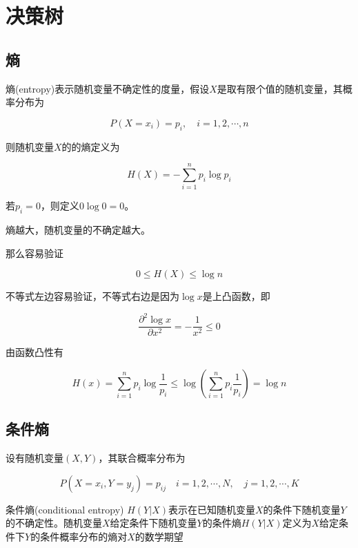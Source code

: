 \section{决策树}
\subsection{熵}

熵(entropy)表示随机变量不确定性的度量，假设$X$是取有限个值的随机变量，其概率分布为

\begin{equation*}
    P(X = x_i) = p_i,\quad i=1,2,\cdots, n
\end{equation*}

则随机变量$X$的的熵定义为

\begin{equation}
    H(X) = -\sum_{i=1}^np_i\log p_i
\end{equation}

若$p_i=0$，则定义$0\log 0 = 0$。

熵越大，随机变量的不确定越大。

那么容易验证

\begin{equation}
    0 \leq H(X) \leq \log n
\end{equation}

不等式左边容易验证，不等式右边是因为$\log x$是上凸函数，即

\begin{equation*}
    \frac{\partial^2 \log x}{\partial x^2} = -\frac{1}{x^2} \leq 0
\end{equation*}

由函数凸性有

\begin{equation*}
    H(x) = \sum_{i=1}^np_i\log \frac{1}{p_i} \leq \log(\sum_{i=1}^np_i\frac{1}{p_i}) = \log n
\end{equation*}

\subsection{条件熵}

设有随机变量$(X, Y)$，其联合概率分布为

\begin{equation}
    P(X=x_i, Y=y_j) = p_{ij}\quad i=1,2,\cdots,N,\quad j=1,2,\cdots,K
\end{equation}

条件熵(conditional entropy) $H(Y|X)$表示在已知随机变量$X$的条件下随机变量$Y$的不确定性。随机变量$X$给定条件下随机变量$Y$的条件熵$H(Y|X)$定义为$X$给定条件下$Y$的条件概率分布的熵对$X$的数学期望

